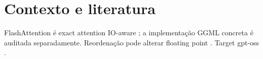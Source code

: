 \section{Contexto e literatura}
FlashAttention é exact attention IO-aware \cite{dao2022flashattention}; a implementação GGML concreta é auditada separadamente. Reordenação pode alterar floating point \cite{goldberg1991floating}. Target gpt-oss \cite{openai2025gptoss}.
